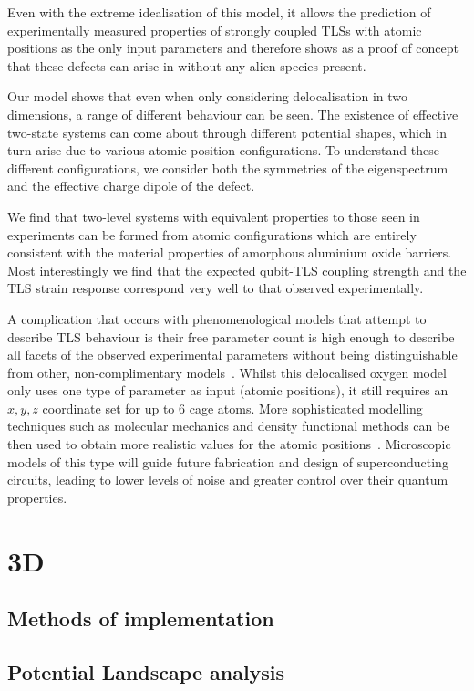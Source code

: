 Even with the extreme idealisation of this model, it allows the prediction of experimentally measured properties of strongly coupled TLSs with atomic positions as the only input parameters and therefore shows as a proof of concept that these defects can arise in  without any alien species present.

Our model shows that even when only considering delocalisation in two dimensions, a range of different behaviour can be seen.
The existence of effective two-state systems can come about through different potential shapes, which in turn arise due to various atomic position configurations.
To understand these different configurations, we consider both the symmetries of the eigenspectrum and the effective charge dipole of the defect.

We find that two-level systems with equivalent properties to those seen in experiments can be formed from atomic configurations which are entirely consistent with the material properties of amorphous aluminium oxide barriers.
Most interestingly we find that the expected qubit-TLS coupling strength and the TLS strain response correspond very well to that observed experimentally.

A complication that occurs with phenomenological models that attempt to describe TLS behaviour is their free parameter count is high enough to describe all facets of the observed experimental parameters without being distinguishable from other, non-complimentary models~\cite{Cole2010}.
Whilst this delocalised oxygen model only uses one type of parameter as input (atomic positions), it still requires an $x, y, z$  coordinate set for up to $6$ cage atoms.
More sophisticated modelling techniques such as molecular mechanics and density functional methods can be then used to obtain more realistic values for the atomic positions~\cite{DuBois2013}.
Microscopic models of this type will guide future fabrication and design of superconducting circuits, leading to lower levels of noise and greater control over their quantum properties.


\section{3D}
\subsection{Methods of implementation}
\subsection{Potential Landscape analysis}
